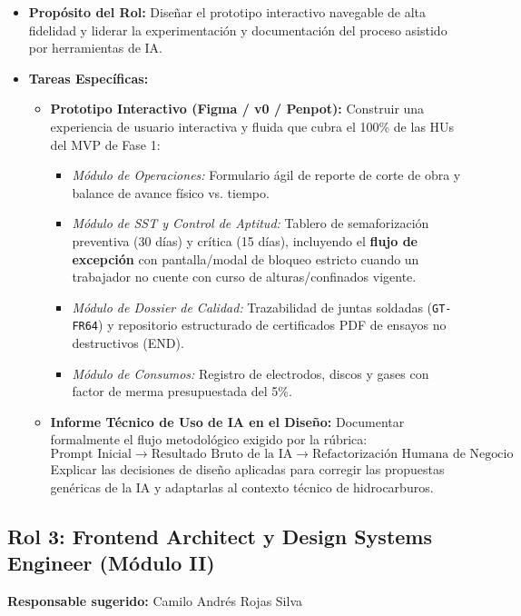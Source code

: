 \documentclass[11pt,letterpaper]{article}
\begin{document}
\begin{itemize}
    \item \textbf{Propósito del Rol:} Diseñar el prototipo interactivo navegable de alta fidelidad y liderar la experimentación y documentación del proceso asistido por herramientas de IA.
    \item \textbf{Tareas Específicas:}
    \begin{itemize}
        \item \textbf{Prototipo Interactivo (Figma / v0 / Penpot):} Construir una experiencia de usuario interactiva y fluida que cubra el 100\% de las HUs del MVP de Fase 1:
        \begin{itemize}
            \item \emph{Módulo de Operaciones:} Formulario ágil de reporte de corte de obra y balance de avance físico vs. tiempo.
            \item \emph{Módulo de SST y Control de Aptitud:} Tablero de semaforización preventiva (30 días) y crítica (15 días), incluyendo el \textbf{flujo de excepción} con pantalla/modal de bloqueo estricto cuando un trabajador no cuente con curso de alturas/confinados vigente.
            \item \emph{Módulo de Dossier de Calidad:} Trazabilidad de juntas soldadas (\texttt{GT-FR64}) y repositorio estructurado de certificados PDF de ensayos no destructivos (END).
            \item \emph{Módulo de Consumos:} Registro de electrodos, discos y gases con factor de merma presupuestada del 5\%.
        \end{itemize}
        \item \textbf{Informe Técnico de Uso de IA en el Diseño:} Documentar formalmente el flujo metodológico exigido por la rúbrica:
        $$\text{Prompt Inicial} \longrightarrow \text{Resultado Bruto de la IA} \longrightarrow \text{Refactorización Humana de Negocio}$$
        Explicar las decisiones de diseño aplicadas para corregir las propuestas genéricas de la IA y adaptarlas al contexto técnico de hidrocarburos.
    \end{itemize}
\end{itemize}

\subsection{Rol 3: Frontend Architect y Design Systems Engineer (Módulo II)}
\textbf{Responsable sugerido:} Camilo Andrés Rojas Silva
\end{document}

